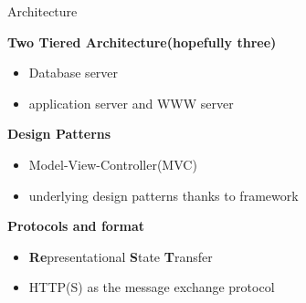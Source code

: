 \documentclass[11pt]{beamer}
\begin{document}
\begin{frame}{Architecture}
\begin{flushleft}
	\textbf{Two Tiered Architecture(hopefully three)}
		\begin{itemize}
			\pause
			\item Database server
			\pause
			\item application server and WWW server
		\end{itemize}
	\textbf{Design Patterns}
	\begin{itemize}
		\pause
		\item Model-View-Controller(MVC)
		\pause
		\item underlying design patterns thanks to framework
	\end{itemize}
	\textbf{Protocols and format}
	\begin{itemize}
		\pause
		\item \textbf{Re}presentational \textbf{S}tate \textbf{T}ransfer%
		\item HTTP(S) as the message exchange protocol  
		
	\end{itemize}
\end{flushleft}
\end{frame}
\end{document}

